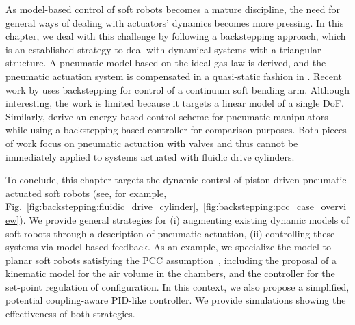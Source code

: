 As model-based control of soft robots becomes a mature discipline, the need for general ways of dealing with actuators' dynamics becomes more pressing. In this chapter, we deal with this challenge by following a backstepping approach, which is an established strategy to deal with dynamical systems with a triangular structure. %
%
A pneumatic model based on the ideal gas law is derived, and the pneumatic actuation system is compensated in a quasi-static fashion in \citet{falkenhahn2016dynamic}.
%
%
%
Recent work by \citet{wang2019parameter} uses backstepping for control of a continuum soft bending arm. Although interesting, the work is limited because it targets a linear model of a single DoF.
Similarly, \citet{franco2021nonlinear} derive an energy-based control scheme for pneumatic manipulators while using a backstepping-based controller for comparison purposes.
% 
Both pieces of work focus on pneumatic actuation with valves and thus cannot be immediately applied to systems actuated with fluidic drive cylinders.

To conclude, this chapter targets the dynamic control of piston-driven pneumatic-actuated soft robots (see, for example, Fig.~\ref{fig:backstepping:fluidic_drive_cylinder},~\ref{fig:backstepping:pcc_case_overview}). 
We provide general strategies for (i) augmenting existing dynamic models of soft robots through a description of pneumatic actuation, (ii) controlling these systems via model-based feedback. 
As an example, we specialize the model to planar soft robots satisfying the \gls{PCC} assumption~\citep{della2020model}, including the proposal of a kinematic model for the air volume in the chambers, and the controller for the set-point regulation of configuration. In this context, we also propose a simplified, potential coupling-aware PID-like controller. We provide simulations showing the effectiveness of both strategies.

